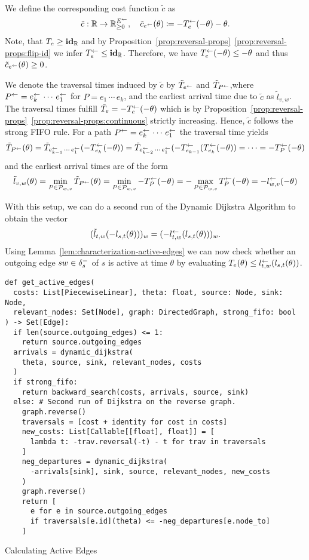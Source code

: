 We define the corresponding cost function $\tilde c$ as \[
    \tilde c : \mathbb{R} \rightarrow \mathbb{R}_{\geq0}^{E^{\leftarrow}}, \quad
    \tilde c_{e^{\leftarrow}}(\theta) \coloneqq - T_e^{\leftarrow}(-\theta) - \theta.
\]
Note, that $T_e  \geq \mathbf{id}_{\mathbb{R}}$ and by Proposition~\ref{prop:reversal-props}~\ref{prop:reversal-props:flip-id} we infer $T_e^{\leftarrow} \leq \mathbf{id}_{\mathbb{R}}$.
Therefore, we have $T_e^{\leftarrow}(-\theta) \leq -\theta$ and thus $\tilde c_{e^{\leftarrow}}(\theta) \geq 0$.

We denote the traversal times induced by $\tilde c$ by $\tilde T_{e^{\leftarrow}}$ and $\tilde T_{P^{\leftarrow}}$,where $P^{\leftarrow} = e_k^{\leftarrow} \, \cdots \, e_1^{\leftarrow}$ for $P = e_1\,\cdots\, e_k$,
and the earliest arrival time due to $\tilde c$ as $\tilde l_{v,w}$.
The traversal times fulfill $\tilde T_e = -T_e^{\leftarrow}(-\theta)$ which is by Proposition~\ref{prop:reversal-props}~\ref{prop:reversal-props:continuous} strictly increasing.
Hence, $\tilde c$ follows the strong FIFO rule.
For a path $P^{\leftarrow} = e_k^{\leftarrow}\,\cdots\, e_1^{\leftarrow}$ the traversal time yields
\[
    \tilde T_{P^{\leftarrow}} (\theta)
    = \tilde T_{e_{k-1}^{\leftarrow}\,\cdots\,e_1^{\leftarrow}}(- T_{e_k}^{\leftarrow} ( - \theta ))
    = \tilde T_{e_{k-2}^{\leftarrow}\,\cdots\,e_1^{\leftarrow}}(-T_{e_{k-1}}^{\leftarrow} (T_{e_k}^{\leftarrow} ( - \theta ))
    = \cdots
    = - T_P^{\leftarrow}(-\theta)
\]
and the earliest arrival times are of the form
\[
    \tilde l_{v,w}(\theta)
    = \min_{P\in\mathcal{P}_{w,v}} \tilde T_{P^{\leftarrow}}(\theta)
    = \min_{P\in\mathcal{P}_{w,v}} - T_P^{\leftarrow}(-\theta)
    = - \max_{P\in\mathcal{P}_{w,v}} T_P^{\leftarrow}(-\theta)
    = - l_{w,v}^{\leftarrow}(-\theta)
\]

With this setup, we can do a second run of the Dynamic Dijkstra Algorithm to obtain the vector \[
    (\tilde l_{t,w}( - l_{s,t}(\theta) ))_w = (- l_{t,w}^{\leftarrow}( l_{s,t}(\theta) ))_w.
\]
Using Lemma~\ref{lem:characterization-active-edges} we can now check whether an outgoing edge $sw\in\delta^-_{s}$ of $s$ is active at time $\theta$ by evaluating $T_e(\theta) \leq l_{t,w}^{\leftarrow}( l_{s,t}(\theta))$.

\begin{algorithm}[h]
    \begin{verbatim}
def get_active_edges(
  costs: List[PiecewiseLinear], theta: float, source: Node, sink: Node,
  relevant_nodes: Set[Node], graph: DirectedGraph, strong_fifo: bool
) -> Set[Edge]:
  if len(source.outgoing_edges) <= 1:
    return source.outgoing_edges
  arrivals = dynamic_dijkstra(
    theta, source, sink, relevant_nodes, costs
  )
  if strong_fifo:
    return backward_search(costs, arrivals, source, sink)
  else: # Second run of Dijkstra on the reverse graph.
    graph.reverse()
    traversals = [cost + identity for cost in costs]
    new_costs: List[Callable[[float], float]] = [
      lambda t: -trav.reversal(-t) - t for trav in traversals
    ]
    neg_departures = dynamic_dijkstra(
      -arrivals[sink], sink, source, relevant_nodes, new_costs
    )
    graph.reverse()
    return [
      e for e in source.outgoing_edges
      if traversals[e.id](theta) <= -neg_departures[e.node_to]
    ]
  \end{verbatim}
  \caption{Calculating Active Edges}
  \label{alg:calculate-active-edges}
\end{algorithm}


